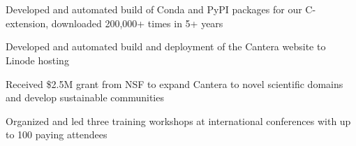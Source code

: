 \sectionsep

\\
\\

\begin{tightemize}
\item Developed and automated build of Conda and PyPI packages for our C-extension, downloaded 200,000+ times in 5+ years
\item Developed and automated build and deployment of the Cantera website to Linode hosting
\item Received \$2.5M grant from NSF to expand Cantera to novel scientific domains and develop sustainable communities
\item Organized and led three training workshops at international conferences with up to 100 paying attendees
\end{tightemize}
\sectionsep

\\
\\

